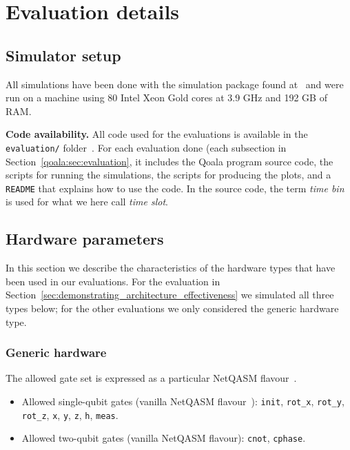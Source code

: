 \section{Evaluation details}
\label{sec:app:evaluation}

\subsection{Simulator setup}
All simulations have been done with the simulation package found at~\cite{qoala2023simulator}
and were run on a machine using 80 Intel Xeon Gold cores at 3.9 GHz and 192 GB of RAM.

\textbf{Code availability.}
All code used for the evaluations is available in the \texttt{evaluation/} folder~\cite{qoala2023simulator}.
For each evaluation done (each subsection in Section~\ref{qoala:sec:evaluation}, it includes the Qoala program source code, the scripts for running the simulations, the scripts for producing the plots, and a \texttt{README} that explains how to use the code.
In the source code, the term \textit{time bin} is used for what we here call \textit{time slot}.

\subsection{Hardware parameters}
In this section we describe the characteristics of the hardware types that have been used in our evaluations.
For the evaluation in Section~\ref{sec:demonstrating_architecture_effectiveness} we simulated all three types below;
for the other evaluations we only considered the generic hardware type.

\subsubsection{Generic hardware}
The allowed gate set is expressed as a particular NetQASM flavour~\cite{dahlberg2022netqasm}.

\begin{itemize}
  \item Allowed single-qubit gates (vanilla NetQASM flavour~\cite{dahlberg2022netqasm}):
  \texttt{init}, \texttt{rot\_x}, \texttt{rot\_y}, \texttt{rot\_z}, \texttt{x}, \texttt{y}, \texttt{z}, \texttt{h}, \texttt{meas}.
  \item Allowed two-qubit gates (vanilla NetQASM flavour): \texttt{cnot}, \texttt{cphase}.
\end{itemize}

